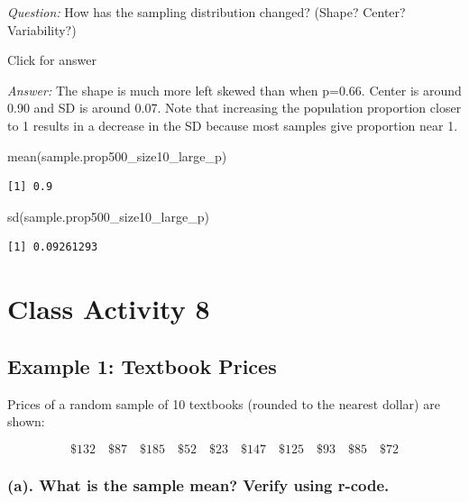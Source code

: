\documentclass[
]{book}
\newenvironment{Shaded}{\begin{snugshade}}{\end{snugshade}}
\newcommand{\FunctionTok}[1]{\textcolor[rgb]{0.00,0.00,0.00}{#1}}
\newcommand{\NormalTok}[1]{#1}
\begin{document}
\emph{Question:} How has the sampling distribution changed? (Shape? Center? Variability?)

Click for answer

\emph{Answer:} The shape is much more left skewed than when p=0.66. Center is around 0.90 and SD is around 0.07. Note that increasing the population proportion closer to 1 results in a decrease in the SD because most samples give proportion near 1.

\begin{Shaded}
\begin{Highlighting}[]
\FunctionTok{mean}\NormalTok{(sample.prop500\_size10\_large\_p)}
\end{Highlighting}
\end{Shaded}

\begin{verbatim}
[1] 0.9
\end{verbatim}

\begin{Shaded}
\begin{Highlighting}[]
\FunctionTok{sd}\NormalTok{(sample.prop500\_size10\_large\_p)}
\end{Highlighting}
\end{Shaded}

\begin{verbatim}
[1] 0.09261293
\end{verbatim}

\hypertarget{class-activity-8}{%
\chapter{Class Activity 8}\label{class-activity-8}}

\hypertarget{example-1-textbook-prices}{%
\section{Example 1: Textbook Prices}\label{example-1-textbook-prices}}

Prices of a random sample of 10 textbooks (rounded to the nearest dollar) are shown:

\[ \$132 \quad \$87 \quad \$185 \quad \$52 \quad \$23 \quad \$147 \quad \$125 \quad \$93 \quad \$85 \quad \$72 \]

\hypertarget{a.-what-is-the-sample-mean-verify-using-r-code.}{%
\subsection{(a). What is the sample mean? Verify using r-code.}\label{a.-what-is-the-sample-mean-verify-using-r-code.}}
\end{document}
